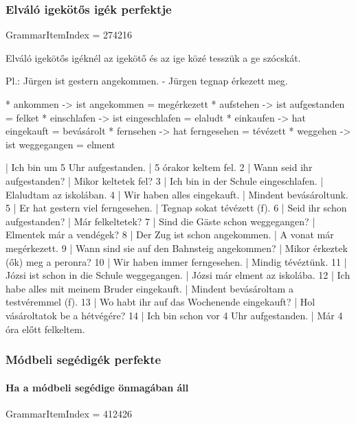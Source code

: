 \documentclass{article}
\newenvironment{desc}{\verbatim}{\endverbatim}
\newenvironment{exmp}{\verbatim}{\endverbatim}
\begin{document}
\subsubsection{Elváló igekötős igék perfektje}

GrammarItemIndex = 274216

\begin{desc}
Elváló igekötős igéknél az igekötő és az ige közé tesszük a ge szócskát.

Pl.: Jürgen ist gestern angekommen. - Jürgen tegnap érkezett meg.

* ankommen -> ist angekommen = megérkezett
* aufstehen -> ist aufgestanden = felket
* einschlafen -> ist eingeschlafen = elaludt
* einkaufen -> hat eingekauft = bevásárolt
* fernsehen -> hat ferngesehen = tévézett
* weggehen -> ist weggegangen = elment
\end{desc}

\begin{exmp}
1 | Ich bin um 5 Uhr aufgestanden. | 5 órakor keltem fel.
2 | Wann seid ihr aufgestanden? | Mikor keltetek fel?
3 | Ich bin in der Schule eingeschlafen. | Elaludtam az iskolában.
4 | Wir haben alles eingekauft. | Mindent bevásároltunk.
5 | Er hat gestern viel ferngesehen. | Tegnap sokat tévézett (f).
6 | Seid ihr schon aufgestanden? | Már felkeltetek?
7 | Sind die Gäste schon weggegangen? | Elmentek már a vendégek?
8 | Der Zug ist schon angekommen. | A vonat már megérkezett.
9 | Wann sind sie auf den Bahnsteig angekommen? | Mikor érkeztek (ők) meg a peronra?
10 | Wir haben immer ferngesehen. | Mindig tévéztünk.
11 | Józsi ist schon in die Schule weggegangen. | Józsi már elment az iskolába.
12 | Ich habe alles mit meinem Bruder eingekauft. | Mindent bevásároltam a testvéremmel (f).
13 | Wo habt ihr auf das Wochenende eingekauft? | Hol vásároltatok be a hétvégére?
14 | Ich bin schon vor 4 Uhr aufgestanden. | Már 4 óra előtt felkeltem.
\end{exmp}

\subsubsection{Módbeli segédigék perfekte}

\paragraph{Ha a módbeli segédige önmagában áll}

GrammarItemIndex = 412426
\end{document}

